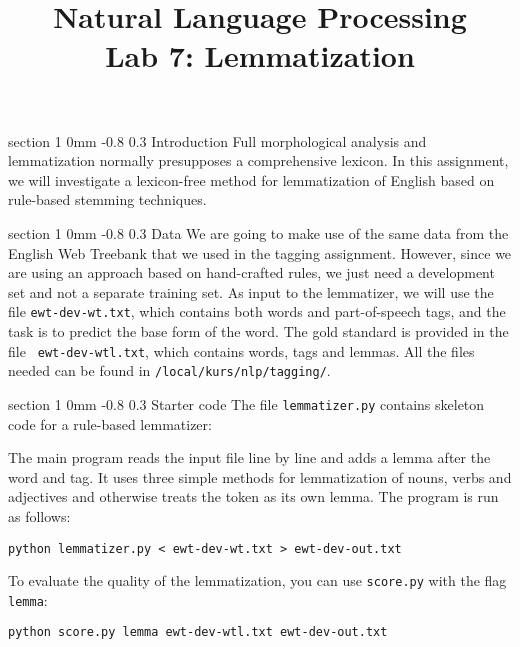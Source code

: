 \documentclass[11pt]{article}
\title{{\LARGE Natural Language Processing}\\[1.5mm]{\large Lab 7:
    Lemmatization}} \author{}
\date{} %
\makeatletter
\newcommand{\newsec}[2]{\section{#1}\label{sec:#2}\noindent}
\renewcommand{\section}{\@startsection
{section}%
{1}%
{0mm}%
{-0.8\baselineskip}%
{0.3\baselineskip}%
{\bfseries\large}}%
\makeatother
\begin{document}
 

\maketitle
\vspace{-2mm} \newsec{Introduction}{intro}%
Full morphological analysis and lemmatization normally presupposes a
comprehensive lexicon. In this assignment, we will investigate a
lexicon-free method for lemmatization of English based on rule-based
stemming techniques.

\newsec{Data}{data}%
We are going to make use of the same data from the English Web
Treebank that we used in the tagging assignment. However, since we are
using an approach based on hand-crafted rules, we just need a
development set and not a separate training set. As input to the
lemmatizer, we will use the file {\tt ewt-dev-wt.txt}, which contains
both words and part-of-speech tags, and the task is to predict the
base form of the word. The gold standard is provided in the file {\tt
  ewt-dev-wtl.txt}, which contains words, tags and lemmas.  All the
files needed can be found in {\tt /local/kurs/nlp/tagging/}.

\newsec{Starter code}{code}%
The file {\tt lemmatizer.py} contains skeleton code for a rule-based lemmatizer:
\begin{center}
\fbox{

}
\end{center}
The main program reads the input file line by line and adds a lemma
after the word and tag. It uses three simple methods for lemmatization
of nouns, verbs and adjectives and otherwise treats the token as its
own lemma. The program is run as follows:
\begin{verbatim}
python lemmatizer.py < ewt-dev-wt.txt > ewt-dev-out.txt
\end{verbatim}
To evaluate the quality of the lemmatization, you can use {\tt score.py} with the flag {\tt lemma}:
\begin{verbatim}
python score.py lemma ewt-dev-wtl.txt ewt-dev-out.txt
\end{verbatim}
\end{document}
